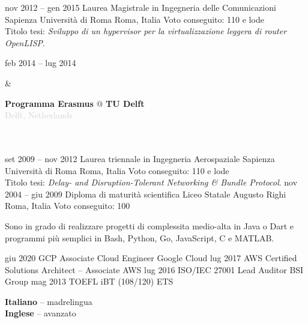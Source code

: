 \documentclass[9pt]{developercv}
\begin{document}

\begin{entrylist}
	\entry
		{nov 2012 -- gen 2015}
		{Laurea Magistrale in Ingegneria delle Comunicazioni}
		{Sapienza Università di Roma}
		{Roma, Italia}
		{
			Voto conseguito: 110 e lode
			\\
			Titolo tesi: \textit{Sviluppo di un hypervisor per la virtualizzazione leggera di router OpenLISP}.
		}
		\parbox[t]{0.2\textwidth}{
			feb 2014 -- lug 2014
		}
		&\parbox[t]{0.8\textwidth}{
			\textbf{Programma Erasmus} @ \textbf{TU Delft}
			\\
			\textcolor{lightgrey}{Delft, Netherlands}
		}\\\\
	\entry
		{set 2009 -- nov 2012}
		{Laurea triennale in Ingegneria Aerospaziale}
		{Sapienza Università di Roma}
		{Roma, Italia}
		{
			Voto conseguito: 110 e lode
			\\
			Titolo tesi: \textit{Delay- and Disruption-Tolerant Networking \& Bundle Protocol}.
		}
	\entry
		{nov 2004 -- giu 2009}
		{Diploma di maturità scientifica}
		{Liceo Statale Augusto Righi}
		{Roma, Italia}
		{Voto conseguito: 100}
\end{entrylist}


\begin{minipage}[t]{1\textwidth}
	\vspace{-\baselineskip}
	Sono in grado di realizzare progetti di complessita medio-alta in Java o Dart e programmi più semplici in Bash, Python, Go, JavaScript, C e MATLAB.
\end{minipage}


\begin{entrylist}
	\entryCert
		{giu 2020}
		{GCP Associate Cloud Engineer}
		{Google Cloud}
	\entryCert
		{lug 2017}
		{AWS Certified Solutions Architect -- Associate}
		{AWS}
	\entryCert
		{lug 2016}
		{ISO/IEC 27001 Lead Auditor}
		{BSI Group}
	\entryCert
		{mag 2013}
		{TOEFL iBT (108/120)}
		{ETS}
\end{entrylist}

\begin{minipage}[t]{1\textwidth}
	\vspace{-\baselineskip}

	
	\textbf{Italiano} -- madrelingua\\
	\textbf{Inglese} -- avanzato
\end{minipage}
\end{document}
